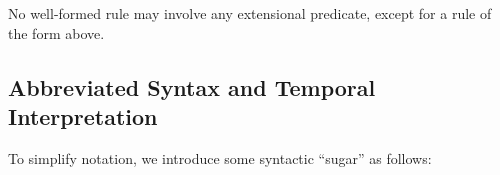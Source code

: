 \vspace{1.2em}
No well-formed \lang rule may involve any extensional predicate, except for a rule of the form above.

\subsection{Abbreviated Syntax and Temporal Interpretation}

\label{sec:abbrvsyntax}



To simplify \lang notation, we introduce some syntactic ``sugar'' as follows:

